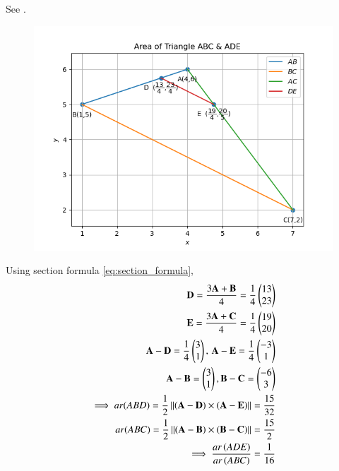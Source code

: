 See  
.
\begin{figure}[!h]
 \begin{center}
 \includegraphics[width=\columnwidth]{chapters/10/7/4/6/figs/fig.png}
 \end{center}
\caption{}
\label{fig:chapters/10/7/4/6Fig1}
\end{figure}
	Using section formula
	  \eqref{eq:section_formula},
\begin{align}
\mathbf{D} =\frac{3\mathbf{A}+\mathbf{B}}{4}
	=\frac{1}{4}\begin{pmatrix}13\\ 23\end{pmatrix}
	\\
\mathbf{E} =\frac{3\mathbf{A}+\mathbf{C}}{4}
	=\frac{1}{4}\begin{pmatrix}19\\ 20\end{pmatrix}
	\\
	\mathbf{A}- \mathbf{D} 
	=\frac{1}{4}\begin{pmatrix}3\\ 1\end{pmatrix},\,
	  \mathbf{A}- \mathbf{E}  
	=\frac{1}{4}\begin{pmatrix}-3\\ 1\end{pmatrix}
	\\
	\mathbf{A}- \mathbf{B} =\begin{pmatrix}3\\1\end{pmatrix},
	  \mathbf{B}-\mathbf{C} =\begin{pmatrix}-6\\3\end{pmatrix}
	  \\
\implies	ar(ABD) =\frac{1}{2} \left\lVert\left(\mathbf{A}-\mathbf{D}\right)  \times 
   \left(\mathbf{A}- \mathbf{E}\right)\right\rVert 
	=	\frac{15}{32}
	\\
	  ar(ABC) =\frac{1}{2} \left\lVert\left(\mathbf{A}-\mathbf{B}\right)  \times 
   \left(\mathbf{B}- \mathbf{C}\right)\right\rVert 
	=	\frac{15}{2}
	\\
	\implies \frac{ar\left(ADE\right)}{ar\left(ABC\right)}=\frac{1}{16}
\end{align}
